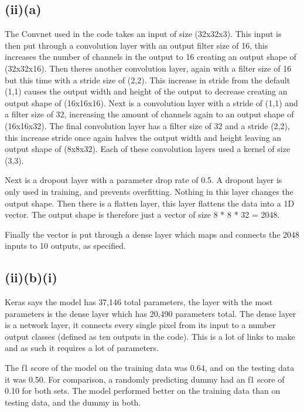 \documentclass{article}
\begin{document}
\subsection{(ii)(a)}
The Convnet used in the code takes an input of size (32x32x3). This input is then put through a convolution layer with an output filter size of 16, this increases the number of channels in the output to 16 creating an output shape of (32x32x16). Then theres another convolution layer, again with a filter size of 16 but this time with a stride size of (2,2). This increase in stride from the default (1,1) causes the output width and height of the output to decrease creating an output shape of (16x16x16). Next is a convolution layer with a stride of (1,1) and a filter size of 32, increasing the amount of channels again to an output shape of (16x16x32). The final convolution layer has a filter size of 32 and a stride (2,2), this increase stride once again halves the output width and height leaving an output shape of (8x8x32). Each of these convolution layers used a kernel of size (3,3).

Next is a dropout layer with a parameter drop rate of 0.5. A dropout layer is only used in training, and prevents overfitting. Nothing in this layer changes the output shape. Then there is a flatten layer, this layer flattens the data into a 1D vector. The output shape is therefore just a vector of size 8 * 8 * 32 = 2048.

Finally the vector is put through a dense layer which maps and connects the 2048 inputs to 10 outputs, as specified. 

\subsection{(ii)(b)(i)}
Keras says the model has 37,146 total parameters, the layer with the most parameters is the dense layer which has 20,490 parameters total. The dense layer is a network layer, it connects every single pixel from its input to a number output classes (defined as ten outputs in the code). This is a lot of links to make and as such it requires a lot of parameters.

The f1 score of the model on the training data was 0.64, and on the testing data it was 0.50. For comparison, a randomly predicting dummy had an f1 score of 0.10 for both sets. The model performed better on the training data than on testing data, and the dummy in both.
\end{document}
